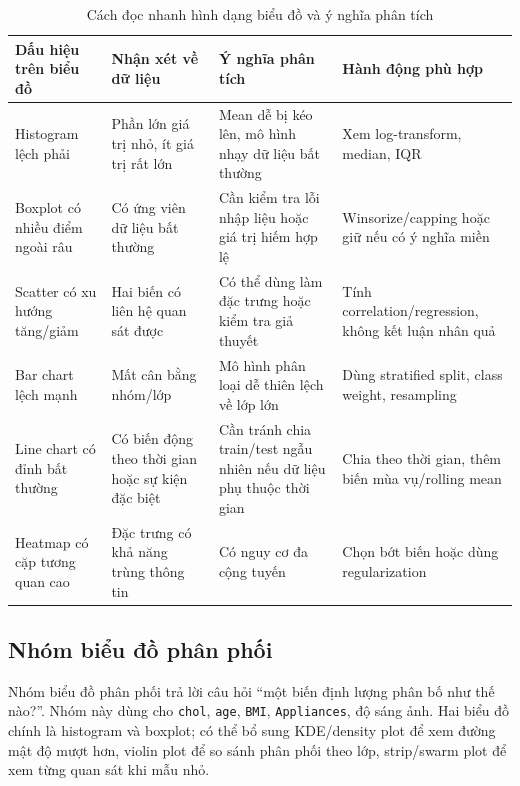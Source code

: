 \begin{table}[H]
\centering
\caption{Cách đọc nhanh hình dạng biểu đồ và ý nghĩa phân tích}
\label{tab:chapter1_chart_reading_guide}
\small
\begin{tabular}{p{}p{}p{}p{}}
\toprule
Dấu hiệu trên biểu đồ & Nhận xét về dữ liệu & Ý nghĩa phân tích & Hành động phù hợp \\
\midrule
Histogram lệch phải & Phần lớn giá trị nhỏ, ít giá trị rất lớn & Mean dễ bị kéo lên, mô hình nhạy dữ liệu bất thường & Xem log-transform, median, IQR \\
Boxplot có nhiều điểm ngoài râu & Có ứng viên dữ liệu bất thường & Cần kiểm tra lỗi nhập liệu hoặc giá trị hiếm hợp lệ & Winsorize/capping hoặc giữ nếu có ý nghĩa miền \\
Scatter có xu hướng tăng/giảm & Hai biến có liên hệ quan sát được & Có thể dùng làm đặc trưng hoặc kiểm tra giả thuyết & Tính correlation/regression, không kết luận nhân quả \\
Bar chart lệch mạnh & Mất cân bằng nhóm/lớp & Mô hình phân loại dễ thiên lệch về lớp lớn & Dùng stratified split, class weight, resampling \\
Line chart có đỉnh bất thường & Có biến động theo thời gian hoặc sự kiện đặc biệt & Cần tránh chia train/test ngẫu nhiên nếu dữ liệu phụ thuộc thời gian & Chia theo thời gian, thêm biến mùa vụ/rolling mean \\
Heatmap có cặp tương quan cao & Đặc trưng có khả năng trùng thông tin & Có nguy cơ đa cộng tuyến & Chọn bớt biến hoặc dùng regularization \\
\bottomrule
\end{tabular}
\end{table}

\subsection{Nhóm biểu đồ phân phối}

Nhóm biểu đồ phân phối trả lời câu hỏi ``một biến định lượng phân bố như thế nào?''. Nhóm này dùng cho \texttt{chol}, \texttt{age}, \texttt{BMI}, \texttt{Appliances}, độ sáng ảnh. Hai biểu đồ chính là histogram và boxplot; có thể bổ sung KDE/density plot để xem đường mật độ mượt hơn, violin plot để so sánh phân phối theo lớp, strip/swarm plot để xem từng quan sát khi mẫu nhỏ.

